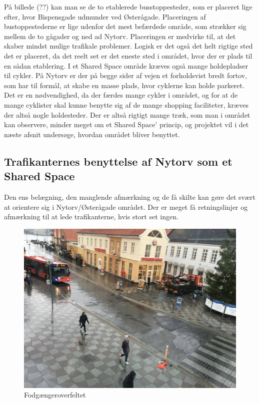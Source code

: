 På billede (??) kan man se de to etablerede busstoppesteder, som er placeret lige efter, hvor Bispensgade udmunder ved Østerågade. Placeringen af bustoppestederne er lige udenfor det mest befærdede område, som strækker sig mellem de to gågader og ned ad Nytorv. Placeringen er medvirke til, at det skaber mindst mulige trafikale problemer. Logisk er det også det helt rigtige sted det er placeret, da det reelt set er det eneste sted i området, hvor der er plads til en sådan etablering. 
I et Shared Space område kræves også mange holdepladser til cykler. På Nytorv er der på begge sider af vejen et forholdsvist bredt fortov, som har til formål, at skabe en masse plads, hvor cyklerne kan holde parkeret. Det er en nødvendighed, da der færdes mange cykler i området, og for at de mange cyklister skal kunne benytte sig af de mange shopping faciliteter, kræves der altså nogle holdesteder. 
Der er altså rigtigt mange træk, som man i området kan observere, minder meget om et Shared Space’ princip, og projektet vil i det næste afsnit undersøge, hvordan området bliver benyttet. 

\subsection{Trafikanternes benyttelse af Nytorv som et Shared Space}
\label{benyttelse_omrade}
Den ens belægning, den manglende afmærkning og de få skilte kan gøre det svært at orientere sig i Nytorv/Østerågade området. Der er meget få retningslinjer og afmærkning til at lede trafikanterne, hvis stort set ingen.

\begin{figure}[htbp]
   \label{fig:Fodfelt}
   \centering
   \begin{adjustbox}{max width=\textwidth}
     \includegraphics[scale=0.3]{billederogfigur/Fodfelt.jpg}
  \end{adjustbox}
   \caption{Fodgængeroverfeltet}
 \end{figure}

